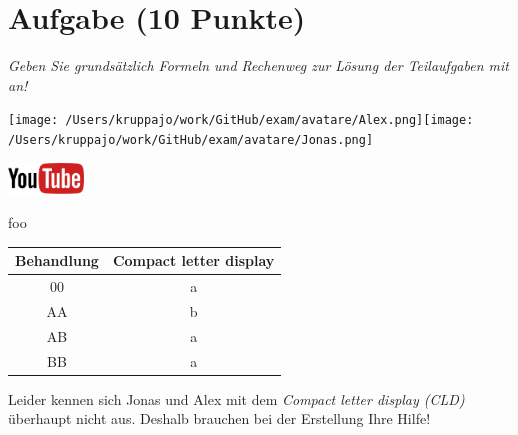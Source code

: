 \documentclass[a4paper, 9pt]{scrartcl}\usepackage[]{graphicx}\usepackage[]{xcolor}
\newenvironment{knitrout}{}{} %
\begin{document}
\section{Aufgabe \hfill (10 Punkte)}

\textit{Geben Sie grundsätzlich Formeln und Rechenweg zur Lösung der Teilaufgaben mit an!} \\[1Ex]
 

 
\begin{minipage}[t]{0.5\textwidth}
\texttt{[image: /Users/kruppajo/work/GitHub/exam/avatare/Alex.png]}\hspace{-4mm}\texttt{[image: /Users/kruppajo/work/GitHub/exam/avatare/Jonas.png]}
\end{minipage}
\begin{minipage}[t]{0.5\textwidth}
\hfill
\href{https://youtu.be/xq29O8qDrg0}{\includegraphics[width = 2cm]{img/youtube}}
\end{minipage}
\vspace{1ex}



foo

\begin{knitrout}
\color{fgcolor}\begin{table}[!h]
\centering\begingroup\fontsize{12}{14}\selectfont

\begin{tabular}{cc}
\toprule
Behandlung & Compact letter display\\
\midrule
00 & a\\
AA & b\\
AB & a\\
BB & a\\
\bottomrule
\end{tabular}
\endgroup{}
\end{table}

\end{knitrout}

Leider kennen sich Jonas und Alex mit dem \textit{Compact letter display (CLD)} überhaupt nicht aus. Deshalb brauchen bei der Erstellung Ihre Hilfe!
\end{document}
